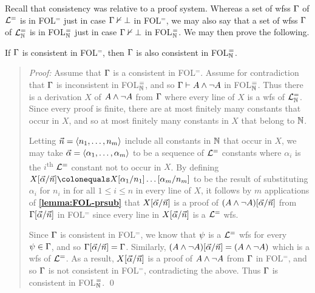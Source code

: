 
Recall that consistency was relative to a proof system.
Whereas a set of wfss $\Gamma$ of $\mathcal{L}^{=}$ is  in FOL$^=$ just in case $\Gamma \nvdash \bot$ in FOL$^=$, we may also say that a set of wfss $\Gamma$ of $\mathcal{L}^{=}_{\mathbb{N}}$ is  in FOL$^=_{\mathbb{N}}$ just in case $\Gamma \nvdash \bot$ in FOL$^=_{\mathbb{N}}$.
We may then prove the following.

\begin{Lthm} \label{lemma:FOL-const}
  If $\Gamma$ is consistent in FOL$^=$, then $\Gamma$ is also consistent in FOL$^=_{\mathbb{N}}$.
\end{Lthm}

\begin{quote} 
  \textit{Proof:} Assume that $\Gamma$ is a consistent in FOL$^=$.
  Assume for contradiction that $\Gamma$ is inconsistent in FOL$^=_{\mathbb{N}}$, and so $\Gamma\vdash A\wedge\neg A$ in FOL$^=_{\mathbb{N}}$.
  Thus there is a derivation $X$ of $A\wedge\neg A$ from $\Gamma$ where every line of $X$ is a wfs of $\mathcal{L}^{=}_{\mathbb{N}}$.
  Since every proof is finite, there are at most finitely many constants that occur in $X$, and so at most finitely many constants in $X$ that belong to $\mathbb{N}$.

  Letting $\vec{n}=\langle n_1,\ldots,n_m\rangle$ include all constants in $\mathbb{N}$ that occur in $X$, we may take $\vec{\alpha}=\langle\alpha_1,\ldots,\alpha_m\rangle$ to be a sequence of $\mathcal{L}^{=}$ constants where $\alpha_i$ is the $i$\textsuperscript{th} $\mathcal{L}^{=}$ constant not to occur in $X$.
  By defining $X\unisub{\vec{\alpha}}{\vec{n}}\colonequals X\unisub{\alpha_1}{n_1}\ldots\unisub{\alpha_m}{n_m}$ to be the result of substituting $\alpha_i$ for $n_i$ in for all $1\leq i\leq n$ in every line of $X$, it follows by $m$ applications of \textbf{\ref{lemma:FOL-prsub}} that $X[\vec{\alpha}/\vec{n}]$ is a proof of $(A\wedge\neg A)[\vec{\alpha}/\vec{n}]$ from $\Gamma[\vec{\alpha}/\vec{n}]$ in FOL$^=$ since every line in $X[\vec{\alpha}/\vec{n}]$ is a $\mathcal{L}^{=}$ wfs.

  Since $\Gamma$ is consistent in FOL$^=$, we know that $\psi$ is a $\mathcal{L}^{=}$ wfs for every $\psi\in\Gamma$, and so $\Gamma[\vec{\alpha}/\vec{n}]=\Gamma$.
  Similarly, $(A\wedge\neg A)[\vec{\alpha}/\vec{n}]=(A\wedge\neg A)$ which is a wfs of $\mathcal{L}^{=}$. 
  As a result, $X[\vec{\alpha}/\vec{n}]$ is a proof of $A\wedge\neg A$ from $\Gamma$ in FOL$^=$, and so $\Gamma$ is not consistent in FOL$^=$, contradicting the above.
  Thus $\Gamma$ is consistent in FOL$^=_{\mathbb{N}}$.
  \qed
\end{quote}

